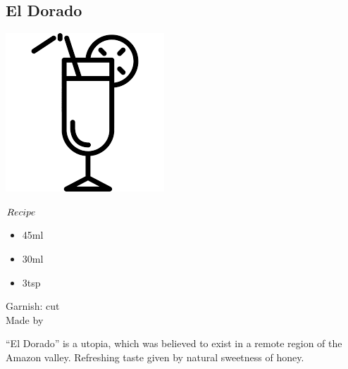 \subsection{El Dorado}
\vspace{-7mm}
\hspace{35mm}
\includegraphics[scale=.07]{cocktail_glass_tall.png}
\vspace{2.5mm}
\begin{itembox}[l]{\boldmath $Recipe$}
\begin{itemize}
\setlength{\parskip}{0cm}
\setlength{\itemsep}{0cm}
\item \teq 45ml
\item \lj 30ml
\item \honey 3tsp
\end{itemize}
\vspace{-4mm}
Garnish: \orange cut\\
Made by \shake
\end{itembox}
``El Dorado'' is a utopia, which was believed to exist in a remote region of the Amazon valley.
Refreshing taste given by natural sweetness of honey.
